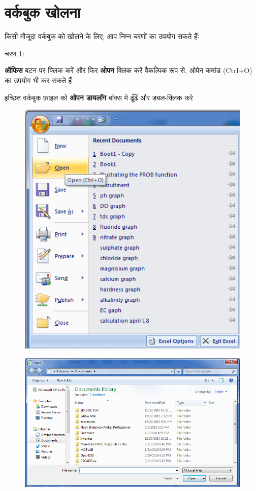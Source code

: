 \section{वर्कबुक खोलना}\label{id-1.4}

किसी मौजूदा वर्कबुक को खोलने के लिए, आप निम्न चरणों का उपयोग सकते हैंः
\begin{descriptionSimple}{चरण 1:}
\item[चरण 1] \textbf{ऑफिस} बटन पर क्लिक करें और फिर \textbf{ओपन} क्लिक करें वैकल्पिक रूप से, ओपेन कमांड  {\eng (Ctrl+O)}  का उपयोग भी कर सकते हैं
\item[चरण 2] इच्छित वर्कबुक फ़ाइल को \textbf{ओपन डायलॉग} बॉक्स मे ढूँढें और डबल-क्लिक करे
\end{descriptionSimple}
\begin{figure}[H]
\centering
\includegraphics[scale=0.3]{src/images/chapter1/chapter1_fig05.png}
\end{figure}
\begin{figure}[H]
\centering
\includegraphics[scale=0.3]{src/images/chapter1/chapter1_fig06.png}
\end{figure}


